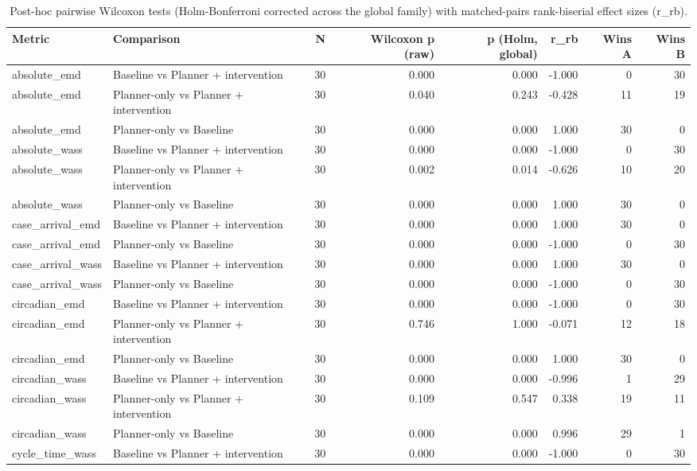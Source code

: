 \begin{table}
\caption{Post-hoc pairwise Wilcoxon tests (Holm-Bonferroni corrected across the global family) with matched-pairs rank-biserial effect sizes (r_rb).}
\label{tab:posthoc}
\begin{tabular}{llrrrrrr}
\toprule
Metric & Comparison & N & Wilcoxon p (raw) & p (Holm, global) & r_rb & Wins A & Wins B \\
\midrule
absolute_emd & Baseline vs Planner + intervention & 30 & 0.000 & 0.000 & -1.000 & 0 & 30 \\
absolute_emd & Planner-only vs Planner + intervention & 30 & 0.040 & 0.243 & -0.428 & 11 & 19 \\
absolute_emd & Planner-only vs Baseline & 30 & 0.000 & 0.000 & 1.000 & 30 & 0 \\
absolute_wass & Baseline vs Planner + intervention & 30 & 0.000 & 0.000 & -1.000 & 0 & 30 \\
absolute_wass & Planner-only vs Planner + intervention & 30 & 0.002 & 0.014 & -0.626 & 10 & 20 \\
absolute_wass & Planner-only vs Baseline & 30 & 0.000 & 0.000 & 1.000 & 30 & 0 \\
case_arrival_emd & Baseline vs Planner + intervention & 30 & 0.000 & 0.000 & 1.000 & 30 & 0 \\
case_arrival_emd & Planner-only vs Baseline & 30 & 0.000 & 0.000 & -1.000 & 0 & 30 \\
case_arrival_wass & Baseline vs Planner + intervention & 30 & 0.000 & 0.000 & 1.000 & 30 & 0 \\
case_arrival_wass & Planner-only vs Baseline & 30 & 0.000 & 0.000 & -1.000 & 0 & 30 \\
circadian_emd & Baseline vs Planner + intervention & 30 & 0.000 & 0.000 & -1.000 & 0 & 30 \\
circadian_emd & Planner-only vs Planner + intervention & 30 & 0.746 & 1.000 & -0.071 & 12 & 18 \\
circadian_emd & Planner-only vs Baseline & 30 & 0.000 & 0.000 & 1.000 & 30 & 0 \\
circadian_wass & Baseline vs Planner + intervention & 30 & 0.000 & 0.000 & -0.996 & 1 & 29 \\
circadian_wass & Planner-only vs Planner + intervention & 30 & 0.109 & 0.547 & 0.338 & 19 & 11 \\
circadian_wass & Planner-only vs Baseline & 30 & 0.000 & 0.000 & 0.996 & 29 & 1 \\
cycle_time_wass & Baseline vs Planner + intervention & 30 & 0.000 & 0.000 & -1.000 & 0 & 30 \\

\end{tabular}
\end{table}
